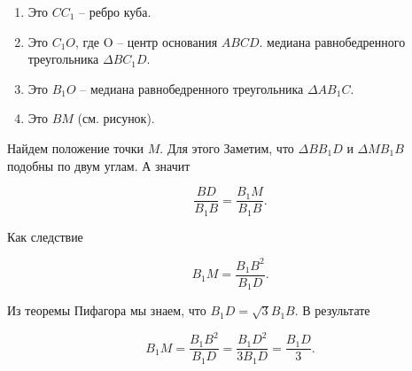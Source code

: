 \begin{enumerate}

\item Это $CC_1$ -- ребро куба.

\item Это $C_1O$, где O -- центр основания $ABCD$. медиана равнобедренного треугольника $\Delta BC_1D$.

\item Это $B_1O$ -- медиана равнобедренного треугольника $\Delta AB_1C$.

\item Это $BM$ (см. рисунок).

\end{enumerate}

\vspace{0.5 cm}

 Найдем положение точки $M$. Для этого Заметим, что $\Delta BB_1D$ и $\Delta MB_1B$ подобны по двум углам. А значит

\begin{equation}
	\frac{BD}{B_1B} = \frac{B_1M}{B_1B}.
\end{equation}

Как следствие

\begin{equation}
	B_1M = \frac{{B_1B}^2}{B_1D}.
\end{equation}

Из теоремы Пифагора мы знаем, что $B_1D = \sqrt{3} B_1B$. В результате

\begin{equation}
	B_1M = \frac{{B_1B}^2}{B_1D} = \frac{{B_1D}^2}{3B_1D} = \frac{B_1D}{3}.
\end{equation}